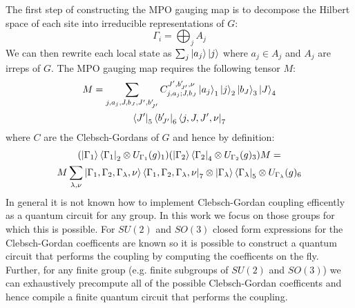 \documentclass[aps,prx,twocolumn,floatfix,10pt,amssymb,amsfont,amsmath,superscriptaddress,float,nofootinbib,longbibliography,nobalancelastpage]{revtex4-2}
\begin{document}
The first step of constructing the MPO gauging map is to decompose the Hilbert space of each site into irreducible representations of $G$:
\begin{equation}
    \Gamma_i = \bigoplus_j A_j
\end{equation}
We can then rewrite each local state as $\sum_j \ket{a_j} \ket{j}$ where $a_j \in A_j$ and $A_j$ are irreps of $G$. The MPO gauging map requires the following tensor $M$:
\begin{multline}
   M= \sum_{j,a_j,J,b_J, J', b'_{J'}} C_{j,a_j;J,b_J}^{J',b'_{J'},\nu}\ket{a_j}_1 \ket{j}_2 \ket{b_J}_3\ket{J}_4\\ \bra{J'}_5\bra{b'_{J'}}_6 \bra{j,J,J',\nu}_7
\end{multline}
where $C$ are the Clebsch-Gordans of $G$ and hence by definition:
\begin{multline}
    (\ket{\Gamma_1}\bra{\Gamma_1}_2\otimes U_{\Gamma_1}(g)_1) (\ket{\Gamma_2}\bra{\Gamma_2}_4\otimes U_{\Gamma_2}(g)_3) M =\\ M \sum_{\lambda, \nu} \ket{\Gamma_1,\Gamma_2,\Gamma_\lambda, \nu}\bra{\Gamma_1,\Gamma_2,\Gamma_\lambda, \nu}_7\otimes\ket{\Gamma_\lambda}\bra{\Gamma_\lambda}_5\otimes U_{\Gamma_\lambda}(g)_6
\end{multline}
In general it is not known how to implement Clebsch-Gordan coupling efficently as a quantum circuit for any group. In this work we focus on those groups for which this is possible. For $SU(2)$ and $SO(3)$ closed form expressions for the Clebsch-Gordan coefficents are known so it is possible to construct a quantum circuit that performs the coupling by computing the coefficents on the fly. Further, for any finite group (e.g. finite subgroups of $SU(2)$ and $SO(3)$) we can exhaustively precompute all of the possible Clebsch-Gordan coefficents and hence compile a finite quantum circuit that performs the coupling. 
\end{document}
